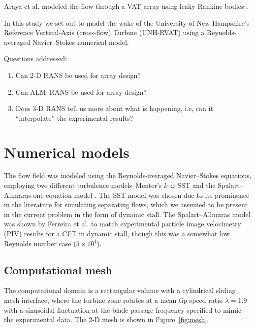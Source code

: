 \documentclass[aip,graphicx]{revtex4-1}
\begin{document}
Araya et al. modeled the flow through a VAT array using leaky Rankine bodies
\cite{Araya2014}.

In this study we set out to model the wake of the University of New Hampshire's
Reference Vertical-Axis (cross-flow) Turbine (UNH-RVAT) using a
Reynolds-averaged Navier--Stokes numerical model.

Questions addressed:

\begin{enumerate}

    \item Can 2-D RANS be used for array design?
    
    \item Can ALM--RANS be used for array design?

    \item Does 3-D RANS tell us more about what is happening, i.e, can it
    ``interpolate'' the experimental results?

\end{enumerate}

\section{Numerical models}

The flow field was modeled using the Reynolds-averaged Navier--Stokes equations,
employing two different turbulence models--Menter's $k$--$\omega$ SST
\cite{Menter1994} and the Spalart--Allmaras one equation model
\cite{Spalart1992}. The SST model was chosen due to its prominence in the
literature for simulating separating flows, which we assumed to be present in
the current problem in the form of dynamic stall. The Spalart--Allmaras model
was shown by Ferreira et al. \cite{Ferreira2007} to match experimental particle
image velocimetry (PIV) results for a CFT in dynamic stall, though this was a
somewhat low Reynolds number case ($5 \times 10^4$).

\subsection{Computational mesh}

The computational domain is a rectangular volume
with a cylindrical sliding mesh interface, where the turbine zone rotates at a
mean tip speed ratio $\lambda=1.9$ with a sinusoidal fluctuation at the blade
passage frequency specified to mimic the experimental data. 
The 2-D mesh is
shown in Figure~\ref{fig:mesh}.
\end{document}
